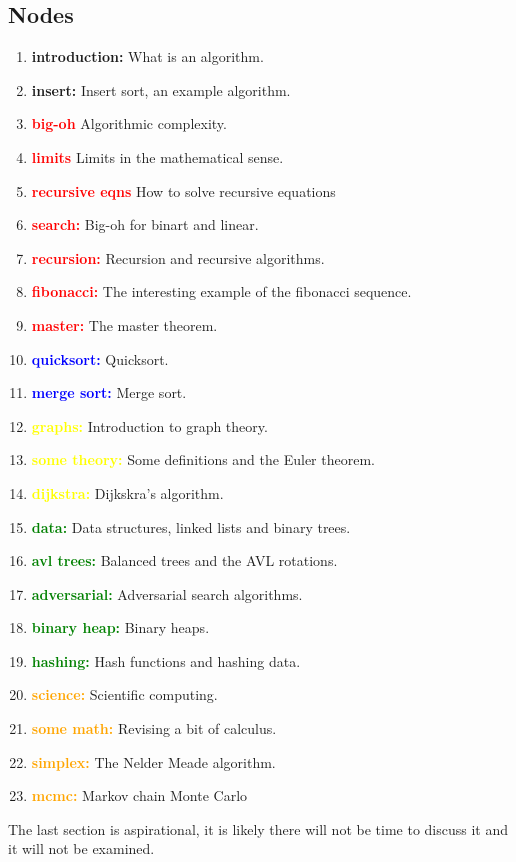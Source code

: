 \documentclass[11pt,a4paper]{scrartcl}
\begin{document}
\subsection*{Nodes}

\begin{enumerate}[label=(\alph*)]
\item \textbf{introduction:} What is an algorithm.
\item \textbf{insert:} Insert sort, an example algorithm.
\item \textbf{\textcolor{red}{big-oh}} Algorithmic complexity.
\item \textbf{\textcolor{red}{limits}} Limits in the mathematical sense.
\item \textbf{\textcolor{red}{recursive eqns}} How to solve recursive equations
\item \textbf{\textcolor{red}{search:}} Big-oh for binart and linear.
\item \textbf{\textcolor{red}{recursion:}} Recursion and recursive algorithms.
\item \textbf{\textcolor{red}{fibonacci:}} The interesting example of the fibonacci sequence. 
\item \textbf{\textcolor{red}{master:}} The master theorem.
\item \textbf{\textcolor{blue}{quicksort:}} Quicksort.
\item \textbf{\textcolor{blue}{merge sort:}} Merge sort.
\item \textbf{\textcolor{yellow}{graphs:}} Introduction to graph theory.
\item \textbf{\textcolor{yellow}{some theory:}} Some definitions and the Euler theorem. 
\item \textbf{\textcolor{yellow}{dijkstra:}} Dijkskra's algorithm.
\item \textbf{\textcolor{green}{data:}} Data structures, linked lists and binary trees.
\item \textbf{\textcolor{green}{avl trees:}} Balanced trees and the AVL rotations. 
\item \textbf{\textcolor{green}{adversarial:}} Adversarial search algorithms.
\item \textbf{\textcolor{green}{binary heap:}} Binary heaps. 
\item \textbf{\textcolor{green}{hashing:}} Hash functions and hashing data. 
\item \textbf{\textcolor{orange}{science:}} Scientific computing.
\item \textbf{\textcolor{orange}{some math:}} Revising a bit of calculus.
\item \textbf{\textcolor{orange}{simplex:}} The Nelder Meade algorithm.
\item \textbf{\textcolor{orange}{mcmc:}} Markov chain Monte Carlo

\end{enumerate}

The last section is aspirational, it is likely there will not be time to discuss it and it will not be examined.
\end{document}
